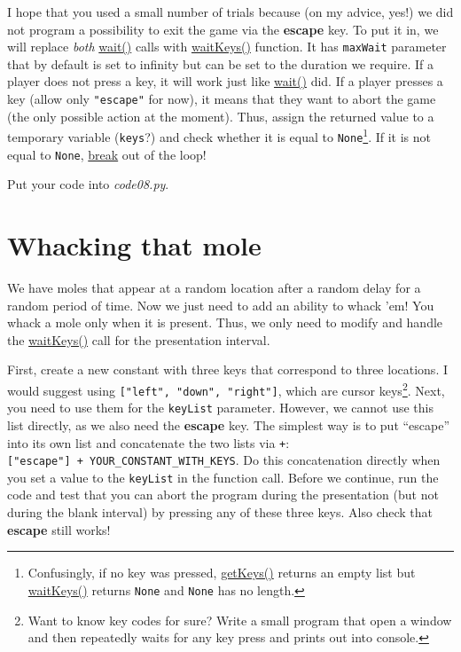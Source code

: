 \documentclass[
]{book}
\begin{document}
I hope that you used a small number of trials because (on my advice, yes!) we did not program a possibility to exit the game via the \textbf{escape} key. To put it in, we will replace \emph{both} \href{https://psychopy.org/api/clock.html\#psychopy.clock.wait}{wait()} calls with \href{https://psychopy.org/api/event.html\#psychopy.event.waitKeys}{waitKeys()} function. It has \texttt{maxWait} parameter that by default is set to infinity but can be set to the duration we require. If a player does not press a key, it will work just like \href{https://psychopy.org/api/clock.html\#psychopy.clock.wait}{wait()} did. If a player presses a key (allow only \texttt{"escape"} for now), it means that they want to abort the game (the only possible action at the moment). Thus, assign the returned value to a temporary variable (\texttt{keys}?) and check whether it is equal to \texttt{None}\footnote{Confusingly, if no key was pressed, \href{https://psychopy.org/api/event.html\#psychopy.event.getKeys}{getKeys()} returns an empty list but \href{https://psychopy.org/api/event.html\#psychopy.event.waitKeys}{waitKeys()} returns \texttt{None} and \texttt{None} has no length.}. If it is not equal to \texttt{None}, \protect\hyperlink{break}{break} out of the loop!

Put your code into \emph{code08.py}.

\hypertarget{whacking-that-mole}{%
\section{Whacking that mole}\label{whacking-that-mole}}

We have moles that appear at a random location after a random delay for a random period of time. Now we just need to add an ability to whack 'em! You whack a mole only when it is present. Thus, we only need to modify and handle the \href{https://psychopy.org/api/event.html\#psychopy.event.waitKeys}{waitKeys()} call for the presentation interval.

First, create a new constant with three keys that correspond to three locations. I would suggest using \texttt{{[}"left",\ "down",\ "right"{]}}, which are cursor keys\footnote{Want to know key codes for sure? Write a small program that open a window and then repeatedly waits for any key press and prints out into console.}. Next, you need to use them for the \texttt{keyList} parameter. However, we cannot use this list directly, as we also need the \textbf{escape} key. The simplest way is to put ``escape'' into its own list and concatenate the two lists via \texttt{+}: \texttt{{[}"escape"{]}\ +\ YOUR\_CONSTANT\_WITH\_KEYS}. Do this concatenation directly when you set a value to the \texttt{keyList} in the function call. Before we continue, run the code and test that you can abort the program during the presentation (but not during the blank interval) by pressing any of these three keys. Also check that \textbf{escape} still works!
\end{document}
